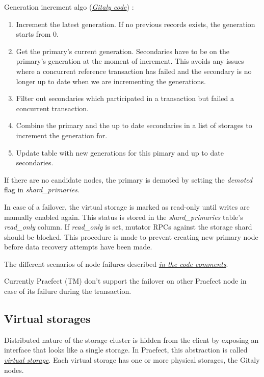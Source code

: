 \documentclass[acmlarge, screen, nonacm]{acmart}
\begin{document}
Generation increment algo (\emph{\href{https://gitlab.com/gitlab-org/gitaly/-/blob/master/internal/praefect/datastore/repository_store.go}{Gitaly code}}) :
\begin{enumerate}
\item Increment the latest generation. If no previous records exists, the generation starts from 0.
\item Get the primary's current generation. Secondaries have to be on the primary's generation at the moment of increment. 
This avoids any issues where a concurrent reference transaction has failed and the secondary is no longer up to date when 
we are incrementing the generations.
\item Filter out secondaries which participated in a transaction but failed a concurrent transaction.
\item Combine the primary and the up to date secondaries in a list of storages to increment the generation for.
\item Update table with new generations for this pimary and up to date secondaries.
 \end{enumerate}
If there are no candidate nodes, the primary is demoted by setting the \textit{demoted} flag in \textit{shard\_primaries}.

In case of a failover, the virtual storage is marked as read-only until writes are manually enabled
again. This status is stored in the \textit{shard\_primaries} table's \textit{read\_only }column. 
If \textit{read\_only } is set, mutator RPCs against the storage shard should be blocked. This procedure is made 
to prevent creating new primary node before data recovery attempts have been made.

The different scenarios of node failures described \emph{\href{https://gitlab.com/gitlab-org/gitaly/-/blob/master/internal/praefect/nodes/sql_elector.go\#L401}{in the code comments}}.

Currently Praefect (TM) don't support the failover on other Praefect node in case of its failure during the transaction.

\subsection{Virtual storages}

Distributed nature of the storage cluster is hidden from the client by exposing an interface that looks like a single storage.
In Praefect, this abstraction is called \emph{\href{https://gitlab.com/gitlab-org/gitaly/-/blob/master/doc/virtual_storage.md}{ virtual storage}}. 
Each virtual storage has one or more physical storages, the Gitaly nodes. 
\end{document}
